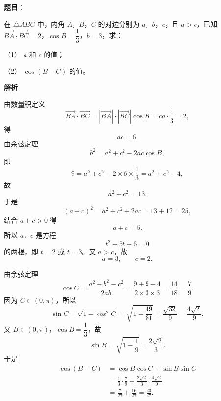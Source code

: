 \begin{answer}

\textbf{题目}：

在 $\triangle ABC$ 中，内角 $A$，$B$，$C$ 的对边分别为 $a$，$b$，$c$，且 $a>c$，已知 $\overrightarrow{BA}\cdot\overrightarrow{BC}=2$，$\cos B=\dfrac13$，$b=3$，求：

（1） $a$ 和 $c$ 的值；

（2） $\cos(B-C)$ 的值。

\textbf{解析}


由数量积定义
\nopagebreak[4]
\[\overrightarrow{BA}\cdot\overrightarrow{BC}
=|\overrightarrow{BA}|\cdot|\overrightarrow{BC}|\cos B
=ca\cdot\frac13=2,\]
得
\nopagebreak[4]
\[ac=6.\]
由余弦定理
\nopagebreak[4]
\[b^2=a^2+c^2-2ac\cos B,\]
即
\nopagebreak[4]
\[9=a^2+c^2-2\times6\times\frac13=a^2+c^2-4,\]
故
\nopagebreak[4]
\[a^2+c^2=13.\]
于是
\nopagebreak[4]
\[(a+c)^2=a^2+c^2+2ac=13+12=25,\]
结合 $a+c>0$ 得
\nopagebreak[4]
\[a+c=5.\]
所以 $a$，$c$ 是方程
\nopagebreak[4]
\[t^2-5t+6=0\]
的两根，即 $t=2$ 或 $t=3$。又 $a>c$，故
\nopagebreak[4]
\[a=3,\qquad c=2.\]


由余弦定理
\nopagebreak[4]
\[\cos C=\frac{a^2+b^2-c^2}{2ab}
=\frac{9+9-4}{2\times3\times3}
=\frac{14}{18}=\frac79.\]
因为 $C\in(0,\pi)$，所以
\nopagebreak[4]
\[\sin C=\sqrt{1-\cos^2C}
=\sqrt{1-\frac{49}{81}}
=\frac{\sqrt{32}}9=\frac{4\sqrt2}9.\]
又 $B\in(0,\pi)$，$\cos B=\dfrac13$，故
\nopagebreak[4]
\[\sin B=\sqrt{1-\frac19}=\frac{2\sqrt2}3.\]
于是
\nopagebreak[4]
\[\begin{aligned}
\cos(B-C)
&=\cos B\cos C+\sin B\sin C\\
&=\frac13\cdot\frac79+\frac{2\sqrt2}3\cdot\frac{4\sqrt2}9\\
&=\frac7{27}+\frac{16}{27}=\frac{23}{27}.
\end{aligned}\]



\end{answer}
